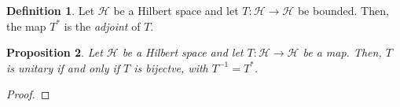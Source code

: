\documentclass[a4paper, openany]{memoir}
\theoremstyle{definition}
\newtheorem{definition}{Definition}[section]
\theoremstyle{plain}
\newtheorem{proposition}[definition]{Proposition}
\begin{document}

    \begin{definition}
        Let $\mathcal{H}$ be a Hilbert space and let $T \colon \mathcal{H} \to \mathcal{H}$ be bounded. Then, the map $T^*$ is the \emph{adjoint} of $T$.
    \end{definition}

    \begin{proposition}
        Let $\mathcal{H}$ be a Hilbert space and let $T \colon \mathcal{H} \to \mathcal{H}$ be a map. Then, $T$ is unitary if and only if $T$ is bijectve, with $T^{-1} = T^*$.
    \end{proposition}
    \begin{proof}
        
    \end{proof}
\end{document}
